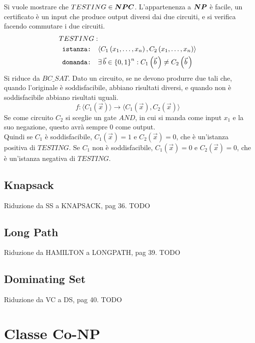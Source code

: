 Si vuole mostrare che $TESTING \in \bm{NPC}$.
L'appartenenza a $\bm{NP}$ è facile, un certificato è un input che produce output diversi dai due circuiti, e si verifica facendo commutare i due circuiti.
\begin{align*}
    TESTING: & \\
    \texttt{istanza:} \quad & \langle
    C_1 \left( x_1, \ldots, x_n \right),
    C_2 \left( x_1, \ldots, x_n \right)
    \rangle \\
    \texttt{domanda:} \quad & \exists \, \vec{b} \in \left\{0,1\right\}^{n} :
    C_1 \left( \vec{b} \, \right) \ne C_2 \left( \vec{b} \, \right)
\end{align*}
Si riduce da $BC\_SAT$.
Dato un circuito, se ne devono produrre due tali che, quando l'originale è soddisfacibile, abbiano risultati diversi, e quando non è soddisfacibile abbiano risultati uguali.
\begin{equation*}
    f : 
    \langle
    C_1 \left( \vec{x} \right)
    \rangle
    \to
    \langle
    C_1 \left( \vec{x} \right),
    C_2 \left( \vec{x} \right)
    \rangle
\end{equation*}
Se come circuito $C_2$ si sceglie un gate $AND$, in cui si manda come input $x_1$ e la suo negazione, questo avrà sempre 0 come output.
\\
Quindi se $C_1$ è soddisfacibile, 
$ C_1 \left( \vec{x} \right) = 1 $
e 
$ C_2 \left( \vec{x} \right) = 0 $,
che è un'istanza positiva di $TESTING$.
Se $C_1$ non è soddisfacibile, 
$ C_1 \left( \vec{x} \right) = 0 $
e 
$ C_2 \left( \vec{x} \right) = 0 $,
che è un'istanza negativa di $TESTING$.

\subsection{Knapsack}
Riduzione da SS a KNAPSACK, pag 36.
TODO

\subsection{Long Path}
Riduzione da HAMILTON a LONGPATH, pag 39.
TODO

\subsection{Dominating Set}
Riduzione da VC a DS, pag 40.
TODO

\section{Classe Co-NP}

